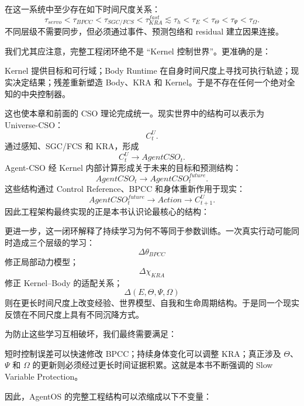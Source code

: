 在这一系统中至少存在如下时间尺度关系：
\[
\boxed{
\tau_{servo}
<
\tau_{BPCC}
<
\tau_{SGC/FCS}
<
\tau_{KRA}^{fast}
\lesssim
\tau_h
<
\tau_E
<
\tau_\Theta
<
\tau_\Psi
<
\tau_\Omega .
}
\]
不同层级不需要同步，但必须通过事件、预测包络和 residual 建立因果连接。

我们尤其应注意，完整工程闭环绝不是 ``Kernel 控制世界''。更准确的是：
\begin{statementbox}
\centering
{}
\end{statementbox}
Kernel 提供目标和可行域；Body Runtime 在自身时间尺度上寻找可执行轨迹；现实决定结果；残差重新塑造 Body、KRA 和 Kernel。于是不存在任何一个绝对全知的中央控制器。

这也使本章和前面的 CSO 理论完成统一。现实世界中的结构可以表示为 Universe-CSO：
\[
C^U_t .
\]
通过感知、SGC/FCS 和 KRA，形成
\[
C^U_t
\rightarrow
AgentCSO_t .
\]
Agent-CSO 经 Kernel 内部计算形成关于未来的目标和预测结构：
\[
AgentCSO_t
\rightarrow
AgentCSO^{future}_t .
\]
这些结构通过 Control Reference、BPCC 和身体重新作用于现实：
\[
AgentCSO^{future}_t
\rightarrow
Action
\rightarrow
C^U_{t+1}.
\]
因此工程架构最终实现的正是本书认识论最核心的结构：
\begin{statementbox}
\centering
{}
\end{statementbox}

更进一步，这一闭环解释了持续学习为何不等同于参数训练。一次真实行动可能同时造成三个层级的学习：
\[
\Delta\theta_{BPCC}
\]
修正局部动力模型；
\[
\Delta\chi_{KRA}
\]
修正 Kernel--Body 的适配关系；
\[
\Delta(E,\Theta,\Psi,\Omega)
\]
则在更长时间尺度上改变经验、世界模型、自我和生命周期结构。于是同一个现实反馈在不同尺度上具有不同沉降方式。

为防止这些学习互相破坏，我们最终需要满足：
\begin{statementbox}
\centering
{}
\end{statementbox}
短时控制误差可以快速修改 BPCC；持续身体变化可以调整 KRA；真正涉及 $\Theta$、$\Psi$ 和 $\Omega$ 的更新则必须经过更长时间证据积累。这就是本书不断强调的 Slow Variable Protection。

因此，AgentOS 的完整工程结构可以浓缩成以下不变量：

